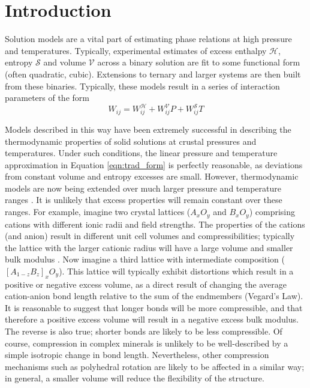 \documentclass[review]{elsarticle}
\begin{document}
\linenumbers

\section{Introduction}

Solution models are a vital part of estimating phase relations at high pressure and temperatures. Typically, experimental estimates of excess enthalpy $\mathcal{H}$, entropy $\mathcal{S}$ and volume $\mathcal{V}$ across a binary solution are fit to some functional form (often quadratic, cubic). Extensions to ternary and larger systems are then built from these binaries. Typically, these models result in a series of interaction parameters of the form
\begin{equation}
  W_{ij} = W_{ij}^{\mathcal{H}} + W_{ij}^{\mathcal{V}}P + W_{ij}^{\mathcal{S}}T
  \label{eqn:trad_form}
\end{equation}

Models described in this way have been extremely successful in describing the thermodynamic properties of solid solutions at crustal pressures and temperatures. Under such conditions, the linear pressure and temperature approximation in Equation \ref{eqn:trad_form} is perfectly reasonable, as deviations from constant volume and entropy excesses are small. However, thermodynamic models are now being extended over much larger pressure and temperature ranges \citep{SLB2011, HP2011, HHPH2013, DKS2013}. It is unlikely that excess properties will remain constant over these ranges. For example, imagine two crystal lattices ($A_xO_y$ and $B_xO_y$) comprising cations with different ionic radii and field strengths. The properties of the cations (and anion) result in different unit cell volumes and compressibilities; typically the lattice with the larger cationic radius will have a large volume and smaller bulk modulus \citep{AA1970}. Now imagine a third lattice with intermediate composition ($[A_{1-z}B_z]_xO_y$). This lattice will typically exhibit distortions which result in a positive or negative excess volume, as a direct result of changing the average cation-anion bond length relative to the sum of the endmembers (Vegard's Law). It is reasonable to suggest that longer bonds will be more compressible, and that therefore a positive excess volume will result in a negative excess bulk modulus. The reverse is also true; shorter bonds are likely to be less compressible. Of course, compression in complex minerals is unlikely to be well-described by a simple isotropic change in bond length. Nevertheless, other compression mechanisms such as polyhedral rotation are likely to be affected in a similar way; in general, a smaller volume will reduce the flexibility of the structure.
\end{document}
